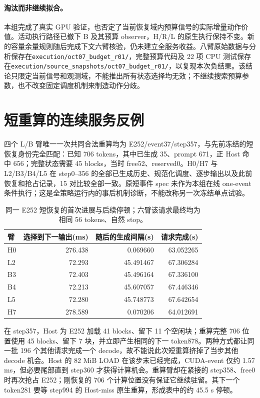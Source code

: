 \documentclass[UTF8,fontset=fandol,a4paper,10pt]{ctexart}
\newcommand{\code}[1]{\nolinkurl{#1}}
\begin{document}
\paragraph{淘汰而非继续拟合。}
本组完成了真实 GPU 验证，也否定了当前恢复域内预算信号的实际增量动作价值。活动执行路径已撤下 B 及其预算 observer，H/R/L 的原生执行保持不变。新的容量余量规则随后完成下文六臂核验，仍未建立全服务收益。八臂原始数据与分析保存在\code{execution/oct07_budget_r01/}，完整预算代码及 22 项 CPU 测试保存在\code{execution/source_snapshots/oct07_budget_r01/}，以复现本次负结果。该结论只限定当前信号和观测域，不能推出所有状态选择均无效；不继续搜索预算参数，也不改变固定调度机制来制造动作分歧。

\section{短重算的连续服务反例}
\label{sec:short-repreempt}
四个 L/B 臂唯一一次共同合法重算均为 E252/event37/step357，与先前冻结的短恢复身份完全匹配：已知 706 tokens，其中已生成 35、prompt 671，正 Host 命中 656；完整状态需要 45 blocks，当时 free52、reserved0。H0/H7 与 L2/B3/B4/L5 在 step0--356 的全部已生成历史、规范化调度、逐步输出以及此前恢复和抢占记录，15 对比较全部一致。原短事件 spec 未作为本组在线 one-event 条件执行；这是全策略运行内的事后机制诊断，不能改称另一次冻结单点试验。

\begin{table}[htbp]
\centering\small
\caption{同一 E252 短恢复的首次进展与后续停顿；六臂该请求最终均为相同 56 tokens、自然 stop。}
\label{tab:short-repreempt}
\begin{tabular}{@{}lrrr@{}}
\toprule
臂 & 选择到下一输出(ms) & 随后的生成间隔(s) & 请求完成(s)\\
\midrule
H0 & 276.438 & 0.069660 & 63.052265\\
L2 & 72.293 & 45.491467 & 67.306284\\
B3 & 72.403 & 45.496164 & 67.336100\\
B4 & 72.213 & 45.607057 & 67.446346\\
L5 & 72.280 & 45.748773 & 67.642654\\
H7 & 278.589 & 0.070206 & 64.012691\\
\bottomrule
\end{tabular}
\end{table}

在 step357，Host 为 E252 加载 41 blocks、留下 11 个空闲块；重算完整 706 位置使用 45 blocks、留下 7 块，并立即产生相同的下一 token878。两种方式都让同一批 196 个其他请求完成一个 decode，故不能说此次短重算挤掉了当步其他 decode 机会。Host 的 82 MiB LOAD 在该步末已经完成，CUDA-event 仅约 1.57 ms，但必要尾部直到 step360 才获得计算机会。重算臂却在紧接的 step358、free0 时再次抢占 E252；刚恢复的 706 个计算位置没有保证它继续驻留。其下一个 token281 要等 step994 的 Host-miss 原生重算，形成表中的约 45.5 s 停顿。
\end{document}
